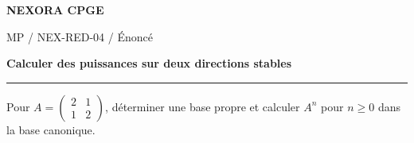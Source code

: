 \documentclass[11pt,a4paper]{article}
\begin{document}
{\small\bfseries\color{nexorablue} NEXORA CPGE}\par
{\small MP / NEX-RED-04 / Énoncé}\par
{\LARGE\bfseries Calculer des puissances sur deux directions stables}\par
\vspace{0.25em}\hrule\vspace{0.6em}

Pour $A=\begin{pmatrix}2&1\\1&2\end{pmatrix}$, déterminer une base propre et calculer $A^n$ pour $n\ge0$ dans la base canonique.
\end{document}
